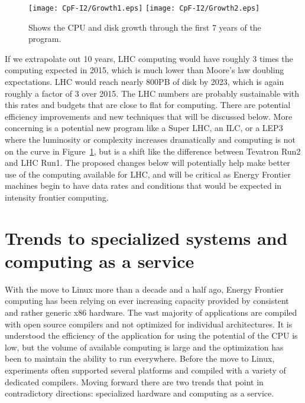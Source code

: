 \begin{figure}[htb]
\begin{center}
\texttt{[image: CpF-I2/Growth1.eps]}
\texttt{[image: CpF-I2/Growth2.eps]}
\caption{Shows the CPU and disk growth through the first 7 years of the program.}
\label{fig:growth}
\end{center}
\end{figure}



If we extrapolate out 10 years, LHC computing would have roughly 3 times the computing expected in 2015, 
which is much lower than Moore's law doubling expectations.    LHC would reach nearly 800PB of disk by 2023, 
which is again roughly a factor of 3 over 2015.    The LHC numbers are probably sustainable with this rates 
and budgets that are close to flat for computing.   There are potential efficiency improvements and new 
techniques that will be discussed below.    More concerning is a potential new program like a Super LHC, an ILC, or a 
LEP3 where the luminosity or complexity increases dramatically and computing is not on the curve in Figure~\ref{fig:growth},
 but is a shift like the difference between Tevatron Run2 and LHC Run1.    The proposed changes below will 
potentially help make better use of the computing available for LHC, and will be critical as Energy 
Frontier machines begin to have data rates and conditions that would be expected in intensity frontier computing.


\section{Trends to specialized systems and computing as a service}
\label{sec:comp-clouds}

With the move to Linux more than a decade and a half ago, Energy Frontier computing has been relying on ever increasing capacity provided by consistent and rather generic x86 hardware.    The vast majority of applications are compiled with open source compilers and not optimized for individual architectures.   It is understood the efficiency of the application for using the potential of the CPU is low, but the volume of available computing is large and the optimization has been to maintain the ability to run everywhere.  Before the move to Linux, experiments often supported several platforms and compiled with a variety of dedicated compilers.     Moving forward there are two trends that point in contradictory directions: specialized hardware and computing as a service. 

